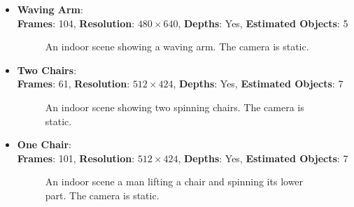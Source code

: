 \begin{itemize}
\begin{figure}[H]
\label{fig:eval_datasets_statue}
\end{figure}
\item \textbf{Waving Arm}: \\
\textbf{Frames}: 104, \textbf{Resolution}: $480 \times 640$, \textbf{Depths}: Yes, \textbf{Estimated Objects}: 5
\begin{figure}[H]
\begin{center}
\end{center}
\caption[Dataset Waving Hand]{An indoor scene showing a waving arm. The camera is static.}
\label{fig:eval_datasets_waving_hand}
\end{figure}
\item \textbf{Two Chairs}: \\
\textbf{Frames}: 61, \textbf{Resolution}: $512 \times 424$, \textbf{Depths}: Yes, \textbf{Estimated Objects}: 7
\begin{figure}[H]
\begin{center}
\end{center}
\caption[Dataset Two Chairs]{An indoor scene showing two spinning chairs. The camera is static.}
\label{fig:eval_datasets_two_chairs}
\end{figure}
\item \textbf{One Chair}: \\
\textbf{Frames}: 101, \textbf{Resolution}: $512 \times 424$, \textbf{Depths}: Yes, \textbf{Estimated Objects}: 7
\begin{figure}[H]
\begin{center}
\end{center}
\caption[Dataset One Chair]{An indoor scene a man lifting a chair and spinning its lower part. The camera is static.}
\label{fig:eval_datasets_one_chair}
\end{figure}
\end{itemize}

